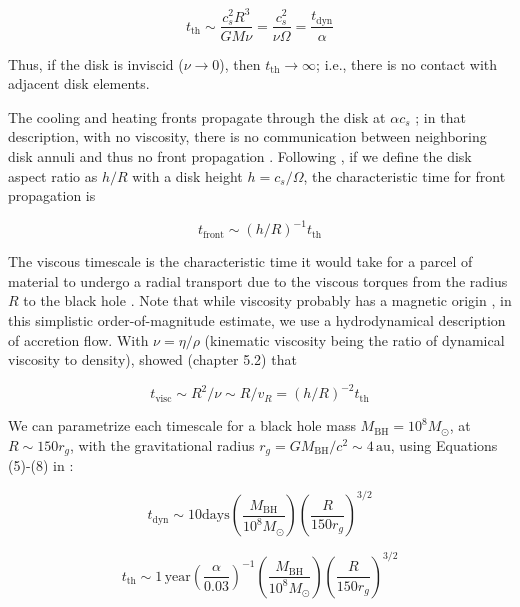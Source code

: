 \documentclass[twocolumn]{aastex62}
\begin{document}
\begin{equation}
t_{\mathrm{th}} {\sim} \frac{c_{s}^{2}R^{3}}{G M \nu } = \frac{c_{s}^{2}}{\nu \Omega} = \frac{t_{\mathrm{dyn}}}{\alpha}
\end{equation}

Thus, if the disk is inviscid ($\nu \rightarrow 0$), then $t_{\mathrm{th}}\rightarrow\infty$; i.e., there is no contact with adjacent disk elements. 

The cooling and heating fronts propagate through the disk at  $\alpha c_{s} $ \citep{hameury2009}; in that description,  with no viscosity, there is no communication between neighboring disk annuli and thus no front propagation \citep{balbus1998, balbus2003}. Following \cite{stern2018}, if we define the disk aspect ratio as $h/R$ with a disk height $h = c_{s} / \Omega$, the characteristic time for front propagation is

\begin{equation}
t_{\mathrm{front}} {\sim} (h/R) ^ {-1} t_{\mathrm{th}}
\end{equation}


The viscous timescale is the characteristic time it would take for a parcel of material to undergo a radial transport due to the viscous torques from the radius $R$ to the black hole \citep{czerny2006}. Note that while viscosity probably has a magnetic origin \citep{eardley1975, grzedzielski2017}, in this simplistic order-of-magnitude estimate, we use a hydrodynamical description of accretion flow.  With $\nu = \eta / \rho$ (kinematic viscosity being the ratio of dynamical viscosity to density), \cite{frank2002} showed (chapter 5.2) that 

\begin{equation}
t_{\mathrm{visc}} {\sim} R^{2} / \nu {\sim}  R / v_{R} = (h/R)^{-2} t_{\mathrm{th}}
\end{equation}

 We can parametrize each timescale for a black hole mass $M_{\mathrm{BH}} = 10^{8} M_{\odot}$, at $R {\sim} 150 r_{g}$, with the gravitational radius $r_{g} = GM_{\mathrm{BH}} / c^{2} {\sim} 4 \, \mathrm{au}$, using Equations (5)-(8) in \cite{stern2018}: 


 \begin{equation}
 t_{\mathrm{dyn}} {\sim} 10  \mathrm{days} \left(\frac{M_{\mathrm{BH}}}{10^{8} M_{\odot}} \right) 
 \left( \frac{R}{150 r_{g}}\right) ^{3/2} 
 \end{equation}

 \begin{equation}
 t_{\mathrm{th}}   {\sim} 1 \,\mathrm{year} \left( \frac{\alpha}{0.03}\right)^{-1}  
 \left( \frac{M_{\mathrm{BH}}}{10^{8} M_{\odot}}\right) \left( \frac{R}{150 r_{g}}\right)^{3/2} 
 \end{equation}
\end{document}
